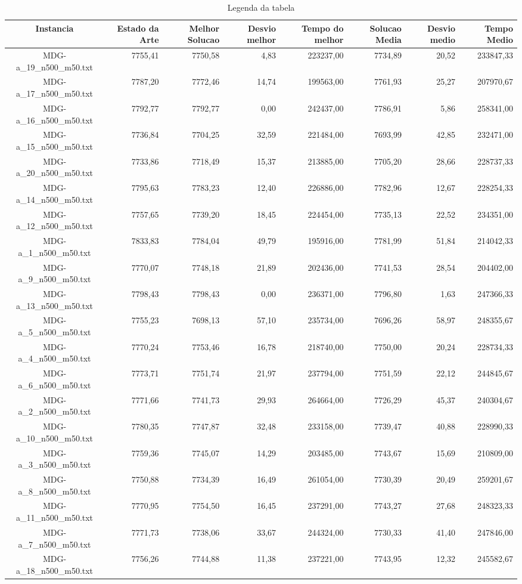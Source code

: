 \begin{landscape}
	\begin{table}[ht]
	\centering
	\begin{tabular}{| c | r | r | r | r | r | r | r |  }
\hline
Instancia&Estado da Arte&Melhor Solucao&Desvio melhor&Tempo do melhor&Solucao Media&Desvio medio&Tempo Medio\\ \hline 
		MDG-a\_19\_n500\_m50.txt&7755,41&7750,58&4,83&223237,00&7734,89&20,52&233847,33\\
		MDG-a\_17\_n500\_m50.txt&7787,20&7772,46&14,74&199563,00&7761,93&25,27&207970,67\\
		MDG-a\_16\_n500\_m50.txt&7792,77&7792,77&0,00&242437,00&7786,91&5,86&258341,00\\
		MDG-a\_15\_n500\_m50.txt&7736,84&7704,25&32,59&221484,00&7693,99&42,85&232471,00\\
		MDG-a\_20\_n500\_m50.txt&7733,86&7718,49&15,37&213885,00&7705,20&28,66&228737,33\\
		MDG-a\_14\_n500\_m50.txt&7795,63&7783,23&12,40&226886,00&7782,96&12,67&228254,33\\
		MDG-a\_12\_n500\_m50.txt&7757,65&7739,20&18,45&224454,00&7735,13&22,52&234351,00\\
		MDG-a\_1\_n500\_m50.txt&7833,83&7784,04&49,79&195916,00&7781,99&51,84&214042,33\\
		MDG-a\_9\_n500\_m50.txt&7770,07&7748,18&21,89&202436,00&7741,53&28,54&204402,00\\
		MDG-a\_13\_n500\_m50.txt&7798,43&7798,43&0,00&236371,00&7796,80&1,63&247366,33\\
		MDG-a\_5\_n500\_m50.txt&7755,23&7698,13&57,10&235734,00&7696,26&58,97&248355,67\\
		MDG-a\_4\_n500\_m50.txt&7770,24&7753,46&16,78&218740,00&7750,00&20,24&228734,33\\
		MDG-a\_6\_n500\_m50.txt&7773,71&7751,74&21,97&237794,00&7751,59&22,12&244845,67\\
		MDG-a\_2\_n500\_m50.txt&7771,66&7741,73&29,93&264664,00&7726,29&45,37&240304,67\\
		MDG-a\_10\_n500\_m50.txt&7780,35&7747,87&32,48&233158,00&7739,47&40,88&228990,33\\
		MDG-a\_3\_n500\_m50.txt&7759,36&7745,07&14,29&203485,00&7743,67&15,69&210809,00\\
		MDG-a\_8\_n500\_m50.txt&7750,88&7734,39&16,49&261054,00&7730,39&20,49&259201,67\\
		MDG-a\_11\_n500\_m50.txt&7770,95&7754,50&16,45&237291,00&7743,27&27,68&248323,33\\
		MDG-a\_7\_n500\_m50.txt&7771,73&7738,06&33,67&244324,00&7730,33&41,40&247846,00\\
		MDG-a\_18\_n500\_m50.txt&7756,26&7744,88&11,38&237221,00&7743,95&12,32&245582,67\\
\hline
	\end{tabular}
	\caption{Legenda da tabela}
	\label{seu_label}
	\end{table}
\end{landscape}
